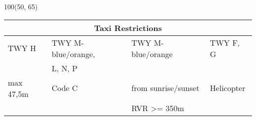 \documentclass[10pt,landscape,a4paper]{article}
\begin{document}
\begin{textblock}{100}(50, 65)
\begin{table}[]
\begin{tabular}{|l|l|l|l|}
\multicolumn{4}{c}{\textbf{Taxi Restrictions}} \\ \hline
TWY H & TWY M-blue/orange,  & TWY M-blue/orange & TWY F, G \\ 
& L, N, P & & \\ \hline
max 47,5m & Code C & from sunrise/sunset & Helicopter \\
& & RVR >= 350m  & \\ \hline
\end{tabular}
\end{table}
\end{textblock}
\end{document}
